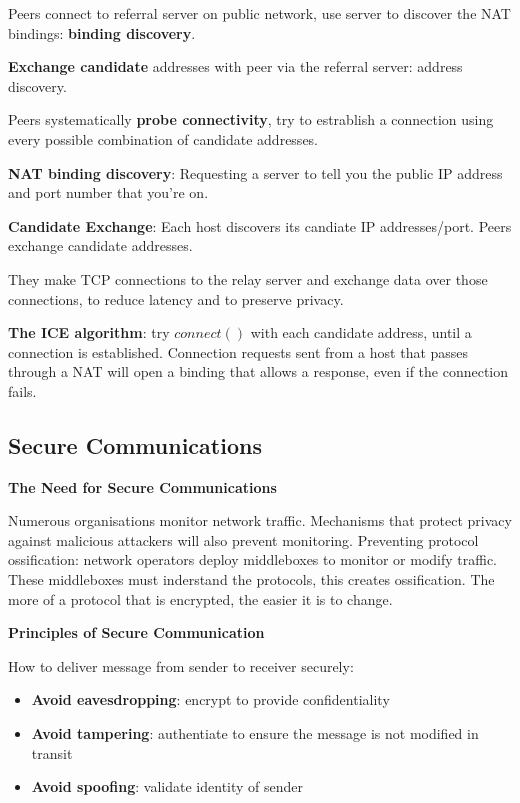 \documentclass{article}
\begin{document}
Peers connect to referral server on public network, use server to discover the NAT bindings: \textbf{binding discovery}.

\textbf{Exchange candidate} addresses with peer via the referral server: address discovery.

Peers systematically \textbf{probe connectivity}, try to estrablish a connection using every possible combination of candidate addresses.

\textbf{NAT binding discovery}: Requesting a server to tell you the public IP address and port number that you're on.

\textbf{Candidate Exchange}: Each host discovers its candiate IP addresses/port. Peers exchange candidate addresses.

They make TCP connections to the relay server and exchange data over those connections, to reduce latency and to preserve privacy.

\textbf{The ICE algorithm}: try $connect()$ with each candidate address, until a connection is established.
Connection requests sent from a host that passes through a NAT will open a binding that allows a response, even if the connection fails.

\clearpage

\subsection*{Secure Communications}

\textbf{The Need for Secure Communications}

Numerous organisations monitor network traffic.
Mechanisms that protect privacy against malicious attackers will also prevent monitoring.
Preventing protocol ossification: network operators deploy middleboxes to monitor or modify traffic.
These middleboxes must inderstand the protocols, this creates ossification.
The more of a protocol that is encrypted, the easier it is to change.

\vspace{\baselineskip}
\textbf{Principles of Secure Communication}

How to deliver message from sender to receiver securely:

\begin{itemize}
    \item \textbf{Avoid eavesdropping}: encrypt to provide confidentiality
    \item \textbf{Avoid tampering}: authentiate to ensure the message is not modified in transit
    \item \textbf{Avoid spoofing}: validate identity of sender
\end{itemize}
\end{document}
